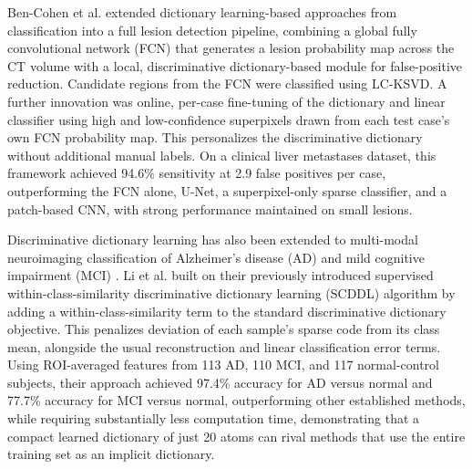 Ben-Cohen et al. \cite{ben2018fully} extended dictionary learning-based approaches from classification into a full lesion detection pipeline,
combining a global fully convolutional network (FCN) that generates a lesion probability map across the CT volume with a local,
discriminative dictionary-based module for false-positive reduction. Candidate regions from the FCN were classified using LC-KSVD.
A further innovation was online, per-case fine-tuning of the dictionary and linear classifier using high and low-confidence
superpixels drawn from each test case's own FCN probability map. This personalizes the discriminative dictionary without additional
manual labels. On a clinical liver metastases dataset, this framework achieved 94.6\% sensitivity at
2.9 false positives per case, outperforming the FCN alone, U-Net, a superpixel-only sparse classifier, and a patch-based CNN,
with strong performance maintained on small lesions.


Discriminative dictionary learning has also been extended to multi-modal neuroimaging classification of Alzheimer's disease (AD) and
mild cognitive impairment (MCI) \cite{li2018classification}. Li et al. built on their previously introduced supervised within-class-similarity discriminative
dictionary learning (SCDDL) algorithm by adding a within-class-similarity term to the standard discriminative dictionary objective.
This penalizes deviation of each sample's sparse code from its class mean, alongside the usual reconstruction and linear classification
error terms. Using ROI-averaged features from 113 AD, 110 MCI, and 117 normal-control subjects, their approach achieved 97.4\%
accuracy for AD versus normal and 77.7\% accuracy for MCI versus normal, outperforming 
other established methods, while requiring substantially less computation time, demonstrating that a compact learned
dictionary of just 20 atoms can rival methods that use the entire training set as an implicit dictionary.


